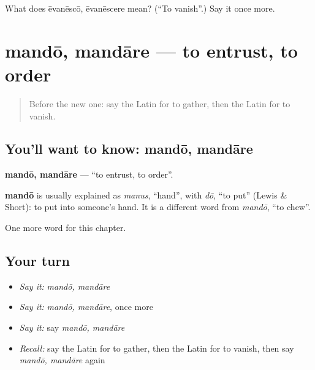 \begin{tcolorbox}[breakable,colback=teal!4,colframe=teal!35!black,title={Before you move on}]
What does ēvanēscō, ēvanēscere mean? (\textquotedblleft{}To vanish\textquotedblright{}.) Say it once more.
\end{tcolorbox}
\section[mandō, mandāre]{mandō, mandāre — to entrust, to order}

\label{lesson:LA-C234-mando}



\begin{quote}
Before the new one: say the Latin for to gather, then the Latin for to vanish.
\end{quote}

\subsection*{You'll want to know: mandō, mandāre}
\textbf{mandō, mandāre} — \textquotedblleft{}to entrust, to order\textquotedblright{}.

\begin{cousinweb}
\textbf{mandō} is usually explained as \emph{manus}, \textquotedblleft{}hand\textquotedblright{}, with \emph{dō}, \textquotedblleft{}to put\textquotedblright{} (Lewis \& Short): to put into someone's hand. It is a different word from \emph{mandō}, \textquotedblleft{}to chew\textquotedblright{}.
\end{cousinweb}

\begin{grammarlens}[title={What you've built}]
One more word for this chapter.
\end{grammarlens}

\subsection*{Your turn}
\begin{itemize}
\raggedright
  \item \emph{Say it:} \emph{mandō, mandāre}
  \item \emph{Say it:} \emph{mandō, mandāre}, once more
  \item \emph{Say it:} say \emph{mandō, mandāre}
  \item \emph{Recall:} say the Latin for to gather, then the Latin for to vanish, then say \emph{mandō, mandāre} again
\end{itemize}

